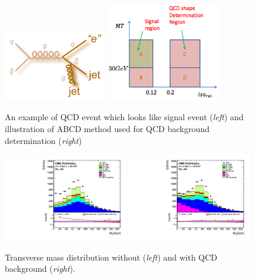 \begin{figure}[htbp]
	\centering
		\includegraphics[width=0.4\textwidth]{Figures/QCD_diag.png}
		\includegraphics[width=0.45\textwidth]{Figures/QCD_AB.png}		
	\caption[QCD diagram and illustration of QCD background determination]{An example of QCD event which looks like signal event (\textit{left}) and illustration of ABCD method used for QCD background determination (\textit{right})}
	\label{fig:QCD}
\end{figure} 

\begin{figure}[htbp]
	\centering
		\includegraphics[width=0.48\textwidth]{Figures/VMt_QCD_before.pdf}
		\includegraphics[width=0.48\textwidth]{Figures/VMt_QCD_after.pdf}		
	\caption[Transverse mass distribution before and after QCD distribution determination.]{Transverse mass distribution without (\textit{left}) and with QCD background (\textit{right}).}
	\label{fig:QCD_dist}
\end{figure} 


